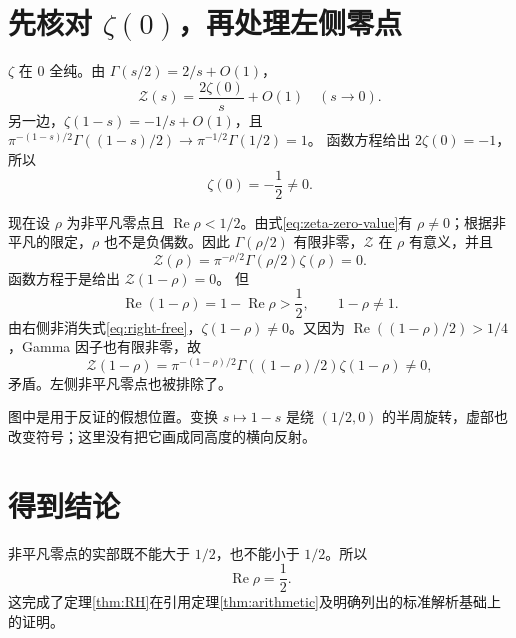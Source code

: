 \documentclass[UTF8,fontset=fandol,a4paper,openany,oneside]{ctexbook}
\theoremstyle{definition}
\theoremstyle{remark}
\newcommand{\Rea}{\operatorname{Re}}
\newcommand{\Ima}{\operatorname{Im}}
\begin{document}
\section{先核对 \texorpdfstring{$\zeta(0)$}{ζ(0)}，再处理左侧零点}
$\zeta$ 在 $0$ 全纯。由 $\Gamma(s/2)=2/s+O(1)$，
\[
\mathcal Z(s)=\frac{2\zeta(0)}s+O(1)\quad(s\to0).
\]
另一边，$\zeta(1-s)=-1/s+O(1)$，且
$\pi^{-(1-s)/2}\Gamma((1-s)/2)\to\pi^{-1/2}\Gamma(1/2)=1$。
函数方程给出 $2\zeta(0)=-1$，所以
\begin{equation}
\zeta(0)=-\frac12\ne0.
\label{eq:zeta-zero-value}
\end{equation}

现在设 $\rho$ 为非平凡零点且 $\Rea\rho<1/2$。由式\eqref{eq:zeta-zero-value}有 $\rho\ne0$；根据非平凡的限定，$\rho$ 也不是负偶数。因此 $\Gamma(\rho/2)$ 有限非零，$\mathcal Z$ 在 $\rho$ 有意义，并且
\[
\mathcal Z(\rho)=\pi^{-\rho/2}\Gamma(\rho/2)\zeta(\rho)=0.
\]
函数方程于是给出 $\mathcal Z(1-\rho)=0$。
但
\[
\Rea(1-\rho)=1-\Rea\rho>\frac12,
\qquad 1-\rho\ne1.
\]
由右侧非消失式\eqref{eq:right-free}，$\zeta(1-\rho)\ne0$。又因为
$\Rea((1-\rho)/2)>1/4$，Gamma 因子也有限非零，故
\[
\mathcal Z(1-\rho)=
\pi^{-(1-\rho)/2}\Gamma((1-\rho)/2)\zeta(1-\rho)\ne0,
\]
矛盾。左侧非平凡零点也被排除了。

\begin{center}
\end{center}
图中是用于反证的假想位置。变换 $s\mapsto1-s$ 是绕 $(1/2,0)$ 的半周旋转，虚部也改变符号；这里没有把它画成同高度的横向反射。

\section{得到结论}
非平凡零点的实部既不能大于 $1/2$，也不能小于 $1/2$。所以
\[
\boxed{\Rea\rho=\frac12.}
\]
这完成了定理\ref{thm:RH}在引用定理\ref{thm:arithmetic}及明确列出的标准解析基础上的证明。
\end{document}
